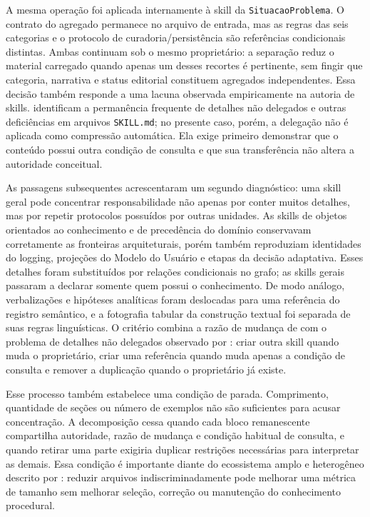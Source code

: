 \documentclass[preprint,12pt,authoryear]{elsarticle}
\begin{document}
A mesma operação foi aplicada internamente à skill da \texttt{SituacaoProblema}. O contrato do agregado permanece no arquivo de entrada, mas as regras das seis categorias e o protocolo de curadoria/persistência são referências condicionais distintas. Ambas continuam sob o mesmo proprietário: a separação reduz o material carregado quando apenas um desses recortes é pertinente, sem fingir que categoria, narrativa e status editorial constituem agregados independentes. Essa decisão também responde a uma lacuna observada empiricamente na autoria de skills. \citet{hong2026smells} identificam a permanência frequente de detalhes não delegados e outras deficiências em arquivos \texttt{SKILL.md}; no presente caso, porém, a delegação não é aplicada como compressão automática. Ela exige primeiro demonstrar que o conteúdo possui outra condição de consulta e que sua transferência não altera a autoridade conceitual.

As passagens subsequentes acrescentaram um segundo diagnóstico: uma skill geral pode concentrar responsabilidade não apenas por conter muitos detalhes, mas por repetir protocolos possuídos por outras unidades. As skills de objetos orientados ao conhecimento e de precedência do domínio conservavam corretamente as fronteiras arquiteturais, porém também reproduziam identidades do logging, projeções do Modelo do Usuário e etapas da decisão adaptativa. Esses detalhes foram substituídos por relações condicionais no grafo; as skills gerais passaram a declarar somente quem possui o conhecimento. De modo análogo, verbalizações e hipóteses analíticas foram deslocadas para uma referência do registro semântico, e a fotografia tabular da construção textual foi separada de suas regras linguísticas. O critério combina a razão de mudança de \citet{parnas1972criteria} com o problema de detalhes não delegados observado por \citet{hong2026smells}: criar outra skill quando muda o proprietário, criar uma referência quando muda apenas a condição de consulta e remover a duplicação quando o proprietário já existe.

Esse processo também estabelece uma condição de parada. Comprimento, quantidade de seções ou número de exemplos não são suficientes para acusar concentração. A decomposição cessa quando cada bloco remanescente compartilha autoridade, razão de mudança e condição habitual de consulta, e quando retirar uma parte exigiria duplicar restrições necessárias para interpretar as demais. Essa condição é importante diante do ecossistema amplo e heterogêneo descrito por \citet{destefanis2026gitskills}: reduzir arquivos indiscriminadamente pode melhorar uma métrica de tamanho sem melhorar seleção, correção ou manutenção do conhecimento procedural.
\end{document}
